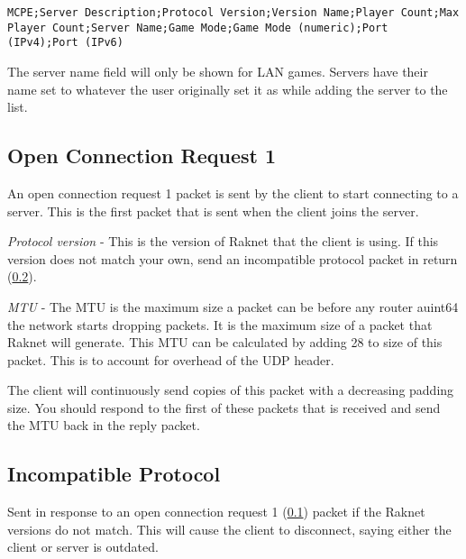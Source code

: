 \texttt{MCPE;Server Description;Protocol Version;Version Name;Player Count;Max Player Count;Server Name;Game Mode;Game Mode (numeric);Port (IPv4);Port (IPv6)}

The server name field will only be shown for LAN games.
Servers have their name set to whatever the user originally set it as while adding the server to the list.

\subsection{Open Connection Request 1}\label{subsec:open-connection-request1}

An open connection request 1 packet is sent by the client to start connecting to a server.
This is the first packet that is sent when the client joins the server.


\textit{Protocol version} - This is the version of Raknet that the client is using.
If this version does not match your own, send an incompatible protocol packet in return
(\ref{subsec:incompatible-protocol}). 

\textit{MTU} - The MTU is the maximum size a packet can be before any router auint64 the network
starts dropping packets. It is the maximum size of a packet that Raknet will generate.
This MTU can be calculated by adding 28 to size of this packet. This is to account for overhead of the UDP header.

The client will continuously send copies of this packet with a decreasing padding size.
You should respond to the first of these packets that is received and send the MTU back in the reply packet.

\subsection{Incompatible Protocol}\label{subsec:incompatible-protocol}

Sent in response to an open connection request 1 (\ref{subsec:open-connection-request1}) packet if the Raknet versions do not match.
This will cause the client to disconnect, saying either the client or server is outdated.

